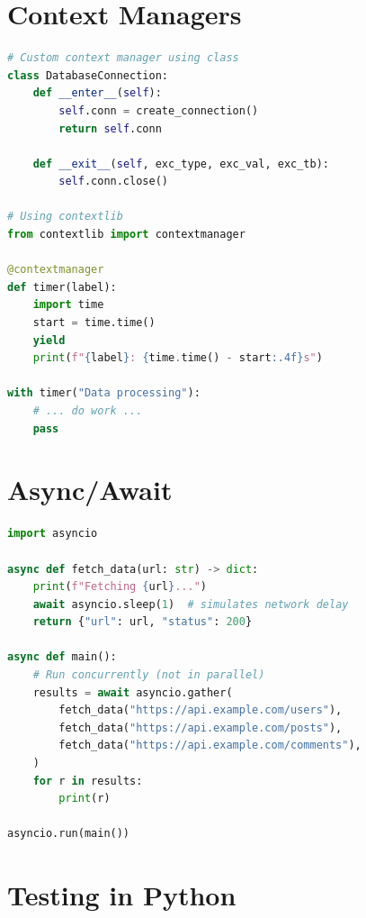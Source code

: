 \documentclass[12pt, a4paper, oneside]{book}
\begin{document}
\section{Context Managers}

\begin{lstlisting}[language=Python, caption={Context managers}]
# Custom context manager using class
class DatabaseConnection:
    def __enter__(self):
        self.conn = create_connection()
        return self.conn

    def __exit__(self, exc_type, exc_val, exc_tb):
        self.conn.close()

# Using contextlib
from contextlib import contextmanager

@contextmanager
def timer(label):
    import time
    start = time.time()
    yield
    print(f"{label}: {time.time() - start:.4f}s")

with timer("Data processing"):
    # ... do work ...
    pass
\end{lstlisting}

\section{Async/Await}

\begin{lstlisting}[language=Python, caption={Asynchronous Python}]
import asyncio

async def fetch_data(url: str) -> dict:
    print(f"Fetching {url}...")
    await asyncio.sleep(1)  # simulates network delay
    return {"url": url, "status": 200}

async def main():
    # Run concurrently (not in parallel)
    results = await asyncio.gather(
        fetch_data("https://api.example.com/users"),
        fetch_data("https://api.example.com/posts"),
        fetch_data("https://api.example.com/comments"),
    )
    for r in results:
        print(r)

asyncio.run(main())
\end{lstlisting}

\section{Testing in Python}
\end{document}
